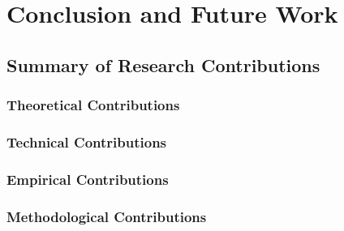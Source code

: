 
\chapter{Conclusion and Future Work} \label{chp:conclusion}


\section{Summary of Research Contributions}

\subsection{Theoretical Contributions}

\subsection{Technical Contributions}

\subsection{Empirical Contributions}

\subsection{Methodological Contributions}

